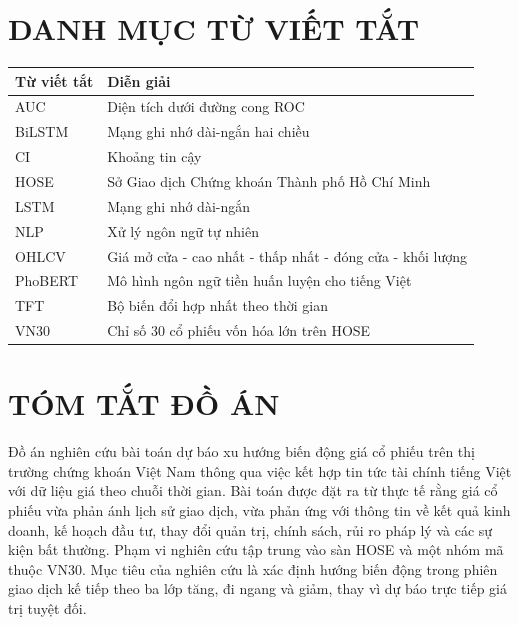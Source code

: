 \documentclass[12pt, a4paper, oneside]{report}
\begin{document}
\chapter*{DANH MỤC TỪ VIẾT TẮT}
\thispagestyle{empty}

\begin{longtable}{p{3cm} p{10.5cm}}
\toprule
Từ viết tắt & Diễn giải \\
\midrule
\endhead
AUC     & Diện tích dưới đường cong ROC \\
BiLSTM  & Mạng ghi nhớ dài-ngắn hai chiều \\
CI      & Khoảng tin cậy \\
HOSE    & Sở Giao dịch Chứng khoán Thành phố Hồ Chí Minh \\
LSTM    & Mạng ghi nhớ dài-ngắn \\
NLP     & Xử lý ngôn ngữ tự nhiên \\
OHLCV   & Giá mở cửa - cao nhất - thấp nhất - đóng cửa - khối lượng \\
PhoBERT & Mô hình ngôn ngữ tiền huấn luyện cho tiếng Việt \\
TFT     & Bộ biến đổi hợp nhất theo thời gian \\
VN30    & Chỉ số 30 cổ phiếu vốn hóa lớn trên HOSE \\
\bottomrule
\end{longtable}

\clearpage
{}
\setcounter{page}{1}

\chapter*{TÓM TẮT ĐỒ ÁN}

Đồ án nghiên cứu bài toán dự báo xu hướng biến động giá cổ phiếu trên thị trường chứng
khoán Việt Nam thông qua việc kết hợp tin tức tài chính tiếng Việt với dữ liệu giá theo
chuỗi thời gian. Bài toán được đặt ra từ thực tế rằng giá cổ phiếu vừa phản ánh lịch sử
giao dịch, vừa phản ứng với thông tin về kết quả kinh doanh, kế hoạch đầu tư, thay đổi
quản trị, chính sách, rủi ro pháp lý và các sự kiện bất thường. Phạm vi nghiên cứu tập
trung vào sàn HOSE và một nhóm mã thuộc VN30. Mục tiêu của nghiên cứu là xác định hướng
biến động trong phiên giao dịch kế tiếp theo ba lớp tăng, đi ngang và giảm, thay vì dự
báo trực tiếp giá trị tuyệt đối.
\end{document}
